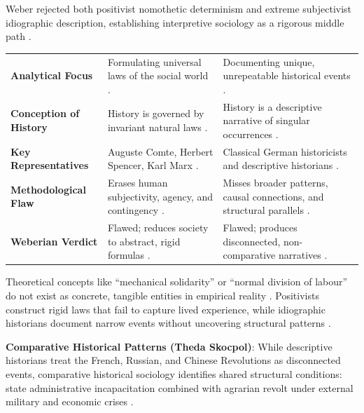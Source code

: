 Weber rejected both positivist nomothetic determinism and extreme subjectivist idiographic description, establishing interpretive sociology as a rigorous middle path .

\begin{table}[htbp]
\centering
\begin{tabularx}{\textwidth}{p{3.2cm} Y Y}
\hline
{}
 &  &  \\
\hline
\textbf{Analytical Focus} & Formulating universal laws of the social world . & Documenting unique, unrepeatable historical events . \\
\textbf{Conception of History} & History is governed by invariant natural laws . & History is a descriptive narrative of singular occurrences . \\
\textbf{Key Representatives} & Auguste Comte, Herbert Spencer, Karl Marx . & Classical German historicists and descriptive historians . \\
\textbf{Methodological Flaw} & Erases human subjectivity, agency, and contingency . & Misses broader patterns, causal connections, and structural parallels . \\
\textbf{Weberian Verdict} & Flawed; reduces society to abstract, rigid formulas . & Flawed; produces disconnected, non-comparative narratives . \\
\hline
\end{tabularx}
\end{table}

\begin{CriticalPoint}
Theoretical concepts like ``mechanical solidarity'' or ``normal division of labour'' do not exist as concrete, tangible entities in empirical reality . Positivists construct rigid laws that fail to capture lived experience, while idiographic historians document narrow events without uncovering structural patterns .
\end{CriticalPoint}

\begin{ExampleBox}
\textbf{Comparative Historical Patterns (Theda Skocpol)}: While descriptive historians treat the French, Russian, and Chinese Revolutions as disconnected events, comparative historical sociology identifies shared structural conditions: state administrative incapacitation combined with agrarian revolt under external military and economic crises .
\end{ExampleBox}

